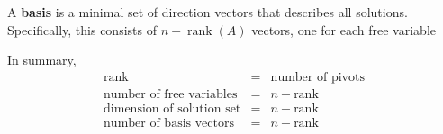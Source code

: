 \begin{mdframed}[frametitle = {Basis}, style = important]
A \textbf{basis} is a minimal set of direction vectors that describes all solutions.
Specifically, this consists of $n - \operatorname{rank}(A)$ vectors, one for each free variable
\end{mdframed}

In summary,
$$\begin{array}{lcl}
\text{rank} &=& \text{number of pivots} \\
\text{number of free variables} &=& n - \text{rank} \\
\text{dimension of solution set} &=& n - \text{rank} \\
\text{number of basis vectors} &=& n - \text{rank}
\end{array}$$

